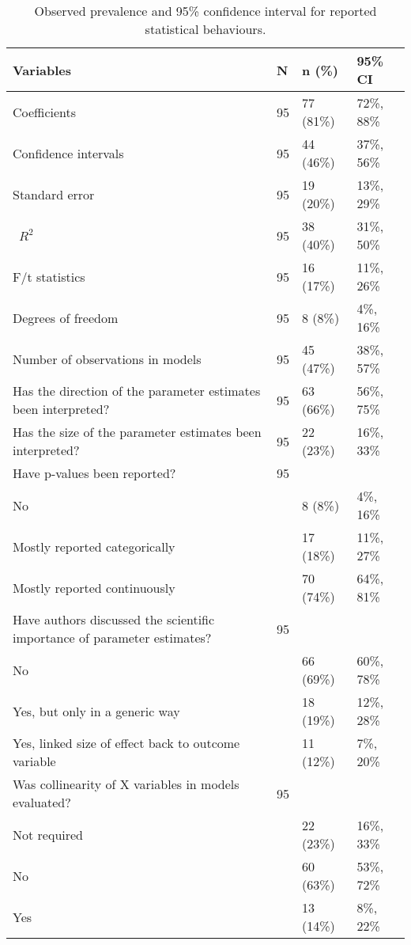 \begin{table}[H]
\begin{widestuff}
\caption{Observed prevalence and 95\% confidence interval for reported statistical behaviours.} 
\begin{flushleft}  \begin{tabular}{p{9cm}lll} 
  \toprule
{\bf Variables} & {\bf N} & {\bf n (\%) } & {\bf 95\% CI} \\ 
  \midrule
Coefficients & 95 & 77 (81\%) & 72\%, 88\% \\ 
  Confidence intervals & 95 & 44 (46\%) & 37\%, 56\% \\ 
  Standard error & 95 & 19 (20\%) & 13\%, 29\% \\ 
  \ $R^2$ & 95 & 38 (40\%) & 31\%, 50\% \\ 
  F/t statistics & 95 & 16 (17\%) & 11\%, 26\% \\ 
  Degrees of freedom & 95 & 8 (8\%) &  4\%, 16\% \\ 
  Number of observations in models & 95 & 45 (47\%) & 38\%, 57\% \\ 
  Has the direction of the parameter estimates been interpreted? & 95 & 63 (66\%) & 56\%, 75\% \\ 
  Has the size of the parameter estimates been interpreted? & 95 & 22 (23\%) & 16\%, 33\% \\ 
  Have p-values been reported? & 95 &  &  \\ 
  No &  & 8 (8\%) &  4\%, 16\% \\ 
  Mostly reported categorically &  & 17 (18\%) & 11\%, 27\% \\ 
  Mostly reported continuously &  & 70 (74\%) & 64\%, 81\% \\ 
  Have authors discussed the scientific importance of parameter estimates? & 95 &  &  \\ 
  No &  & 66 (69\%) & 60\%, 78\% \\ 
  Yes, but only in a generic way &  & 18 (19\%) & 12\%, 28\% \\ 
  Yes, linked size of effect back to outcome variable &  & 11 (12\%) &  7\%, 20\% \\ 
  Was collinearity of X variables in models evaluated? & 95 &  &  \\ 
  Not required &  & 22 (23\%) & 16\%, 33\% \\ 
  No &  & 60 (63\%) & 53\%, 72\% \\ 
  Yes &  & 13 (14\%) &  8\%, 22\% \\ 

\end{tabular}
\end{flushleft}
\end{widestuff}
\end{table}
